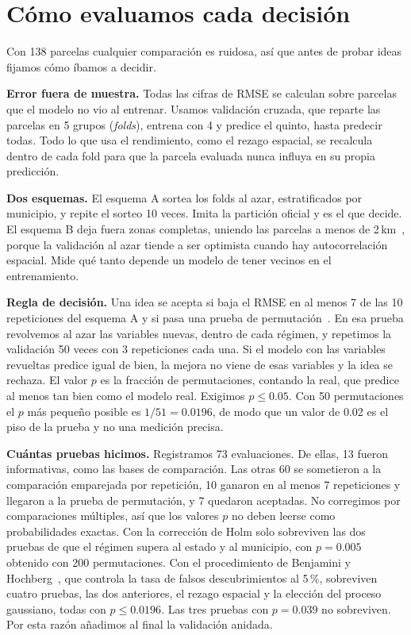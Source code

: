 \section{Cómo evaluamos cada decisión}\label{sec:evaluacion}

Con 138 parcelas cualquier comparación es ruidosa, así que antes de probar ideas fijamos cómo íbamos a decidir.

\textbf{Error fuera de muestra.} Todas las cifras de RMSE se calculan sobre parcelas que el modelo no vio al
entrenar. Usamos validación cruzada, que reparte las parcelas en 5 grupos (\emph{folds}), entrena con 4 y predice el
quinto, hasta predecir todas. Todo lo que usa el rendimiento, como el rezago espacial, se recalcula dentro de cada
fold para que la parcela evaluada nunca influya en su propia predicción.

\textbf{Dos esquemas.} El esquema A sortea los folds al azar, estratificados por municipio, y repite el sorteo 10
veces. Imita la partición oficial y es el que decide. El esquema B deja fuera zonas completas, uniendo las parcelas a
menos de 2\,km~\cite{roberts2017,ploton2020}, porque la validación al azar tiende a ser optimista cuando hay
autocorrelación espacial. Mide qué tanto depende un modelo de tener vecinos en el entrenamiento.

\textbf{Regla de decisión.} Una idea se acepta si baja el RMSE en al menos 7 de las 10 repeticiones del esquema A y si
pasa una prueba de permutación~\cite{ojala2010}. En esa prueba revolvemos al azar las variables nuevas, dentro de cada
régimen, y repetimos la validación 50 veces con 3 repeticiones cada una. Si el modelo con las variables revueltas
predice igual de bien, la mejora no viene de esas variables y la idea se rechaza. El valor $p$ es la fracción de
permutaciones, contando la real, que predice al menos tan bien como el modelo real. Exigimos $p\le0.05$. Con 50
permutaciones el $p$ más pequeño posible es $1/51=0.0196$, de modo que un valor de 0.02 es el piso de la prueba y no una
medición precisa.

\textbf{Cuántas pruebas hicimos.} Registramos 73 evaluaciones. De ellas, 13 fueron informativas, como las bases de
comparación. Las otras 60 se sometieron a la comparación emparejada por repetición, 10 ganaron en al menos 7
repeticiones y llegaron a la prueba de permutación, y 7 quedaron aceptadas. No corregimos por comparaciones múltiples,
así que los valores $p$ no deben leerse como probabilidades exactas. Con la corrección de Holm solo sobreviven las dos
pruebas de que el régimen supera al estado y al municipio, con $p=0.005$ obtenido con 200 permutaciones. Con el
procedimiento de Benjamini y Hochberg~\cite{benjamini1995}, que controla la tasa de falsos descubrimientos al 5\,\%,
sobreviven cuatro pruebas, las dos anteriores, el rezago espacial y la elección del proceso gaussiano, todas con
$p\le0.0196$. Las tres pruebas con $p=0.039$ no sobreviven. Por esta razón añadimos al final la validación anidada.

